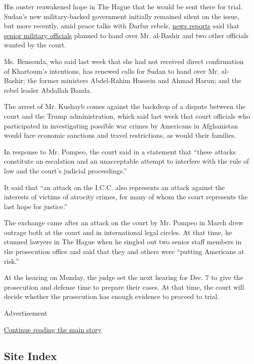 His ouster reawakened hope in The Hague that he would be sent there for
trial. Sudan's new military-backed government initially remained silent
on the issue, but more recently, amid peace talks with Darfur rebels,
\href{https://www.hrw.org/news/2020/02/12/sudan-opens-door-icc-prosecutions}{news
reports} said that
\href{https://apnews.com/c6698024bdd7f1cade89b9b4101d25c1}{senior
military officials} planned to hand over Mr. al-Bashir and two other
officials wanted by the court.

Ms. Bensouda, who said last week that she had not received direct
confirmation of Khartoum's intentions, has renewed calls for Sudan to
hand over Mr. al-Bashir; the former ministers Abdel-Rahim Hussein and
Ahmad Harun; and the rebel leader Abdallah Banda.

The arrest of Mr. Kushayb comes against the backdrop of a dispute
between the court and the Trump administration, which said last week
that court officials who participated in investigating possible war
crimes by Americans in Afghanistan would face economic sanctions and
travel restrictions, as would their families.

In response to Mr. Pompeo, the court said in a statement that ``these
attacks constitute an escalation and an unacceptable attempt to
interfere with the rule of law and the court's judicial proceedings.''

It said that ``an attack on the I.C.C. also represents an attack against
the interests of victims of atrocity crimes, for many of whom the court
represents the last hope for justice.''

The exchange came after an attack on the court by Mr. Pompeo in March
drew outrage both at the court and in international legal circles. At
that time, he stunned lawyers in The Hague when he singled out two
senior staff members in the prosecution office and said that they and
others were ``putting Americans at risk.''

At the hearing on Monday, the judge set the next hearing for Dec. 7 to
give the prosecution and defense time to prepare their cases. At that
time, the court will decide whether the prosecution has enough evidence
to proceed to trial.

Advertisement

\protect\hyperlink{after-bottom}{Continue reading the main story}

\hypertarget{site-index}{%
\subsection{Site Index}\label{site-index}}

